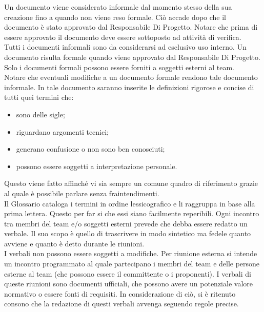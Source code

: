 					Un documento viene considerato informale dal momento stesso della sua creazione fino a quando non viene reso formale. Ciò accade dopo che il documento è stato approvato dal Responsabile Di Progetto. Notare che prima di essere approvato il documento deve essere sottoposto ad attività di verifica.\\
					Tutti i documenti informali sono da considerarsi ad esclusivo uso interno.
					Un documento risulta formale quando viene approvato dal Responsabile Di Progetto. Solo i documenti formali possono essere forniti a soggetti esterni al team.\\
					Notare che eventuali modifiche a un documento formale rendono tale documento informale.
					In tale documento saranno inserite le definizioni rigorose e concise di tutti quei termini che:
					\begin{itemize}
						\item sono delle sigle;
						\item riguardano argomenti tecnici;
						\item generano confusione o non sono ben conosciuti;
						\item possono essere soggetti a interpretazione personale.
					\end{itemize}
					Questo viene fatto affinché vi sia sempre un comune quadro di riferimento grazie al quale è possibile parlare senza fraintendimenti.\\
					Il Glossario cataloga i termini in ordine lessicografico e li raggruppa in base alla prima lettera. Questo per far si che essi siano facilmente reperibili.
				 \label{sec:verbali}
					Ogni incontro tra membri del team e/o soggetti esterni prevede che debba essere redatto un verbale. Il suo scopo è quello di trascrivere in modo sintetico ma fedele quanto avviene e quanto è detto durante le riunioni.\\
					I verbali non possono essere soggetti a modifiche.
						Per riunione esterna si intende un incontro programmato al quale partecipano i membri del team e delle persone esterne al team (che possono essere il committente o i proponenti). I verbali di queste riunioni sono documenti ufficiali, che possono avere un potenziale valore normativo o essere fonti di requisiti. In considerazione di ciò, si è ritenuto consono che la redazione di questi verbali avvenga seguendo regole precise.\\
